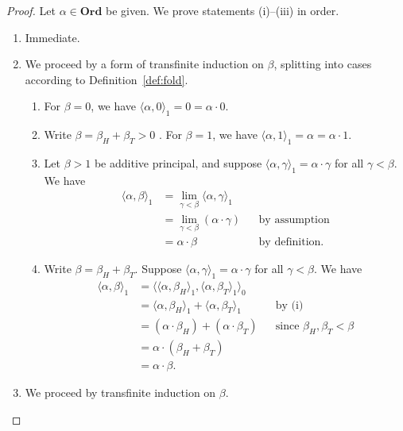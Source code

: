 \documentclass[10pt,a4paper]{amsart}
\newcommand{\op}[2]{\langle#1, #2\rangle}
\newcommand{\ord}{\mathbf{Ord}}
\begin{document}
\begin{proof}
    Let $\alpha \in \ord$ be given. We prove statements (i)--(iii) in order.
    \begin{enumerate}
        \item[(i)] Immediate.
        \item[(ii)] We proceed by a form of transfinite induction on $\beta$, splitting into cases according to Definition~\ref{def:fold}.
        \begin{enumerate}
            \item[(1)] For $\beta = 0$, we have $\op\alpha0_1 = 0 = \alpha\cdot0$.
            \item[(2)] Write $\beta = \beta_H + \beta_T > 0$ . For $\beta = 1$, we have $\op\alpha1_1 = \alpha = \alpha\cdot1$.
            \item[(3)] Let $\beta > 1$ be additive principal, and suppose $\op\alpha\gamma_1 = \alpha \cdot \gamma$ for all $\gamma < \beta$. We have
                \begin{align*}
                    \op\alpha\beta_1 &= \textstyle\lim_{\gamma < \beta} {\op\alpha\gamma_1} && \\
                    &= \textstyle\lim_{\gamma < \beta} {(\alpha \cdot \gamma)} && \text{by assumption} \\
                    &= \alpha \cdot \beta && \text{by definition.}
                \end{align*}
            \item[(4)] Write $\beta = \beta_H + \beta_T$. Suppose $\op\alpha\gamma_1 = \alpha \cdot \gamma$ for all $\gamma < \beta$. We have
                \begin{align*}
                    \op\alpha\beta_1 &= \op{\op\alpha{\beta_H}_1}{\op\alpha{\beta_T}_1}_0 && \\
                    &= \op\alpha{\beta_H}_1 + \op\alpha{\beta_T}_1 && \text{by (i)} \\
                    &= (\alpha \cdot \beta_H) + (\alpha \cdot \beta_T) && \text{since } \beta_H, \beta_T < \beta \\
                    &= \alpha \cdot (\beta_H + \beta_T) && \\
                    &= \alpha \cdot \beta. &&
                \end{align*}
        \end{enumerate}
        \item[(iii)] We proceed by transfinite induction on $\beta$.
        \begin{enumerate}

\end{enumerate}
\end{enumerate}
\end{proof}
\end{document}
